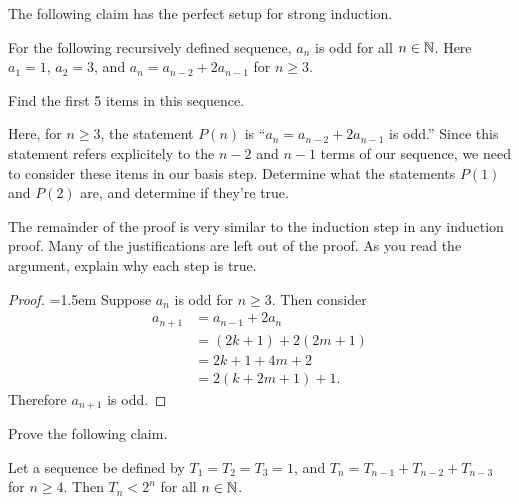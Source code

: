 \begin{question}
\item The following claim has the perfect setup for strong induction.
\begin{claim}  For the following recursively defined sequence, $a_n$ is odd for all $n \in \mathbb{N}$.  Here $a_1=1$, $a_2=3$, and $a_n=a_{n-2}+2a_{n-1}$ for $n \geq 3$.
\end{claim}
\begin{qpart}
\item Find the first 5 items in this sequence.

\vspace{2in}

\item Here, for $n \geq 3$, the statement $P(n)$ is ``$a_n=a_{n-2}+2a_{n-1}$ is odd.''  Since this statement refers explicitely to the $n-2$ and $n-1$ terms of our sequence, we need to consider these items in our basis step.  Determine what the statements $P(1)$ and $P(2)$ are, and determine if they're true.

\vspace{2in}
\item The remainder of the proof is very similar to the induction step in any induction proof.  Many of the justifications are left out of the proof.  As you read the argument, explain why each step is true.

\begin{proof}  \openup=1.5em Suppose $a_n$ is odd for $n \geq 3$.  Then consider
\begin{align*}
a_{n+1} &= a_{n-1}+2a_{n}\\
\ &= (2k+1) + 2(2m+1) \\
\ &= 2k+1+4m+2 \\
\ &= 2(k+2m+1)+1.
\end{align*}
Therefore $a_{n+1}$ is odd.
\end{proof}

\end{qpart}
\newpage
\item Prove the following claim.
\begin{claim}  Let a sequence be defined by $T_1=T_2=T_3=1$, and $T_n=T_{n-1}+T_{n-2}+T_{n-3}$ for $n\geq 4$.  Then $T_n<2^n$ for all $n \in \mathbb{N}$.
\end{claim}

\end{question}





